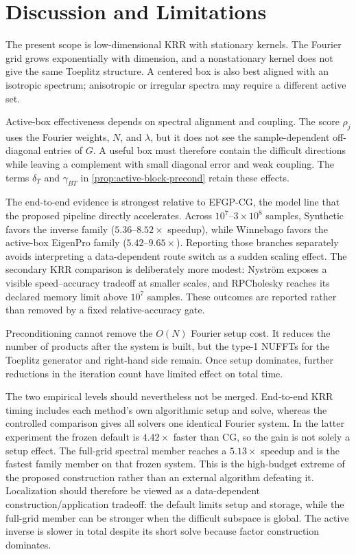\section{Discussion and Limitations}
\label{sec:discussion}

The present scope is low-dimensional KRR with stationary kernels. The Fourier
grid grows exponentially with dimension, and a nonstationary kernel does not
give the same Toeplitz structure. A centered box is also best aligned with an
isotropic spectrum; anisotropic or irregular spectra may require a different
active set.

Active-box effectiveness depends on spectral alignment and coupling. The
score \(\rho_j\) uses the Fourier weights, \(N\), and \(\lambda\), but it does
not see the sample-dependent off-diagonal entries of \(G\). A useful box must
therefore contain the difficult directions while leaving a complement with
small diagonal error and weak coupling. The terms \(\delta_T\) and
\(\gamma_{BT}\) in \cref{prop:active-block-precond} retain these effects.

The end-to-end evidence is strongest relative to EFGP-CG, the model line that
the proposed pipeline directly accelerates.  Across
\(10^7\)--\(3\times10^8\) samples, Synthetic favors the inverse family
(\(5.36\)--\(8.52\times\) speedup), while Winnebago favors the active-box
EigenPro family (\(5.42\)--\(9.65\times\)).  Reporting those branches
separately avoids interpreting a data-dependent route switch as a sudden
scaling effect.  The secondary KRR comparison is deliberately more modest:
Nystr\"om exposes a visible speed--accuracy tradeoff at smaller scales, and
RPCholesky reaches its declared memory limit above \(10^7\) samples.  These
outcomes are reported rather than removed by a fixed relative-accuracy gate.

Preconditioning cannot remove the \(O(N)\) Fourier setup cost. It reduces the
number of products after the system is built, but the type-1 NUFFTs for the
Toeplitz generator and right-hand side remain. Once setup dominates, further
reductions in the iteration count have limited effect on total time.

The two empirical levels should nevertheless not be merged.  End-to-end KRR
timing includes each method's own algorithmic setup and solve, whereas the
controlled comparison gives all solvers one identical Fourier system.  In the
latter experiment the frozen default is \(4.42\times\) faster than CG, so the
gain is not solely a setup effect.  The full-grid spectral member reaches a
\(5.13\times\) speedup and is the fastest family member on that frozen system.
This is the high-budget extreme of the proposed construction rather than an
external algorithm defeating it.  Localization should therefore be viewed as
a data-dependent construction/application tradeoff: the default limits setup
and storage, while the full-grid member can be stronger when the difficult
subspace is global.  The active inverse is slower in total despite its short
solve because factor construction dominates.

